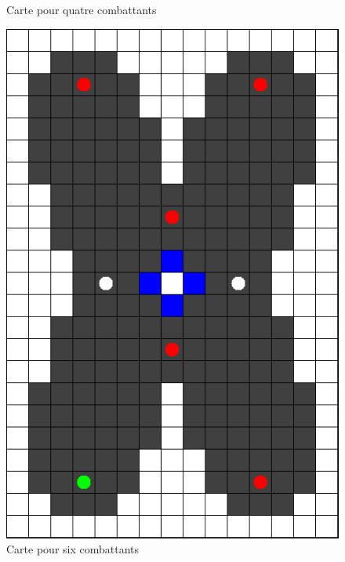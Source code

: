\documentclass[a4paper,12pt]{article}
\begin{document}
\begin{figure}[h!]
\begin{minipage}{0.4\linewidth}
			\caption{Carte pour quatre combattants}
		\end{minipage}
		\vskip 10pt
		\begin{minipage}{0.3\linewidth}
			\centering
			\includegraphics[width=\linewidth]{carte_3}
			\caption{Carte pour six combattants}
		\end{minipage}\hfill
		\begin{minipage}{0.4\linewidth}
			\centering

\end{minipage}
\end{figure}
\end{document}
